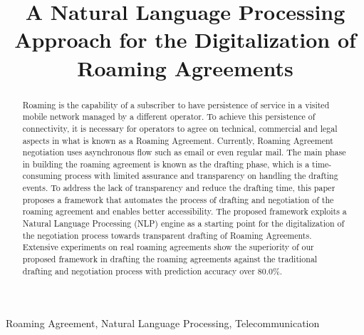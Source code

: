 \documentclass[conference]{style/IEEEtran}
\begin{document}
\title{A Natural Language Processing Approach for the Digitalization of Roaming Agreements\\}

\maketitle

\begin{abstract}
Roaming is the capability of a subscriber to have persistence of service in a visited mobile network managed by a different operator. To achieve this persistence of connectivity, it is necessary for operators to agree on technical, commercial and legal aspects in what is known as a Roaming Agreement. Currently, Roaming Agreement negotiation uses asynchronous flow such as email or even regular mail. The main phase in building the roaming agreement is known as the drafting phase, which is a time-consuming process with limited assurance and transparency on handling the drafting events. To address the lack of transparency and reduce the drafting time, this paper proposes a framework that automates the process of drafting and negotiation of the roaming agreement and enables better accessibility. The proposed framework exploits a Natural Language Processing (NLP) engine as a starting point for the digitalization of the negotiation process towards transparent drafting of Roaming Agreements. Extensive experiments on real roaming agreements show the superiority of our proposed framework in drafting the roaming agreements against the traditional drafting and negotiation process with prediction accuracy over 80.0\%.
\end{abstract}

\begin{IEEEkeywords}
Roaming Agreement, Natural Language Processing, Telecommunication
\end{IEEEkeywords}







%

\printbibliography
\end{document}
